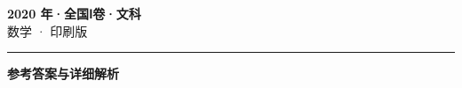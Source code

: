 \documentclass[zihao=5, a4paper]{ctexart}
\begin{document}
\begin{center}
  {\Large\bfseries 2020 年·全国Ⅰ卷·文科}\\[4pt]
  {\large 数学 · 印刷版}
\end{center}
\medskip
{}

\par\bigskip\hrule\bigskip
{}
\begin{center}{\large\bfseries 参考答案与详细解析}\end{center}
\smallskip

\end{document}
